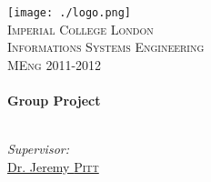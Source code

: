\begin{titlepage}
\begin{center}

\texttt{[image: ./logo.png]}\\[0.45cm]    

\textsc{\LARGE Imperial College London}\\[1cm]
\textsc{\Large Informations Systems Engineering \\ \vspace{5pt} MEng 2011-2012}\\[0.5cm]


\HRule \\[0.4cm]
{ \huge \bfseries Group Project}\\[0.4cm]

\HRule \\[1.5cm]

\begin{minipage}{0.4\textwidth}
\end{minipage}
\begin{minipage}{0.4\textwidth}
\begin{flushright} \large
\emph{Supervisor:} \\
\href{mailto:j.pitt@imperial.ac.uk}{Dr. Jeremy \textsc{Pitt}}
\end{flushright}
\end{minipage}


\end{center}
\end{titlepage}

